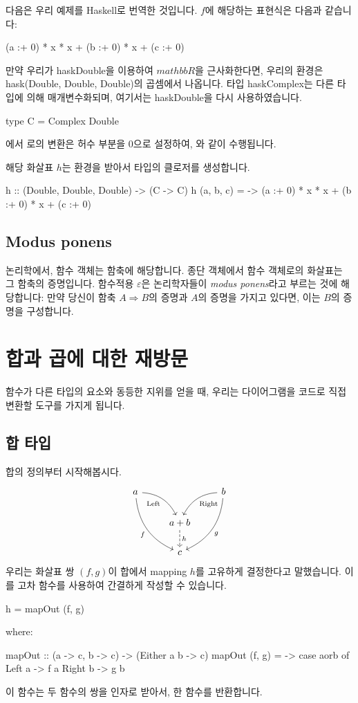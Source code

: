 \documentclass[DaoFP]{subfiles}
\begin{document}
\begin{CJK*}{UTF8}{gbsn}
다음은 우리 예제를 Haskell로 번역한 것입니다. $f$에 해당하는 표현식은 다음과 같습니다:
\begin{haskell}
(a :+ 0) * x * x + (b :+ 0) * x + (c :+ 0)
\end{haskell}
만약 우리가 hask{Double}을 이용하여 $mathbb{R}$을 근사화한다면, 우리의 환경은 hask{(Double, Double, Double)}의 곱셈에서 나옵니다. 타입 hask{Complex}는 다른 타입에 의해 매개변수화되며, 여기서는 hask{Double}을 다시 사용하였습니다.
\begin{haskell}
type C = Complex Double
\end{haskell}
에서 로의 변환은 허수 부분을 0으로 설정하여, 와 같이 수행됩니다.

해당 화살표 $h$는 환경을 받아서  타입의 클로저를 생성합니다.
\begin{haskell}
h :: (Double, Double, Double) -> (C -> C)
h (a, b, c) = \x -> (a :+ 0) * x * x + (b :+ 0) * x + (c :+ 0)
\end{haskell}

\subsection{Modus ponens}

논리학에서, 함수 객체는 함축에 해당합니다. 종단 객체에서 함수 객체로의 화살표는 그 함축의 증명입니다. 함수적용 $\varepsilon$은 논리학자들이 \emph{modus ponens}라고 부르는 것에 해당합니다: 만약 당신이 함축 $A \Rightarrow B$의 증명과 $A$의 증명을 가지고 있다면, 이는 $B$의 증명을 구성합니다.

\section{합과 곱에 대한 재방문}

함수가 다른 타입의 요소와 동등한 지위를 얻을 때, 우리는 다이어그램을 코드로 직접 변환할 도구를 가지게 됩니다.

\subsection{합 타입}

합의 정의부터 시작해봅시다.
\[
 \begin{tikzcd}
 a
 \arrow[dr,  bend left, "\text{Left}"']
 \arrow[ddr, bend right, "f"']
 && b
 \arrow[dl, bend right, "\text{Right}"]
 \arrow[ddl, bend left, "g"]
 \\
&a + b
\arrow[d, dashed, "h"]
\\
& c
 \end{tikzcd}
\]
우리는 화살표 쌍 $(f, g)$이 합에서 mapping $h$를 고유하게 결정한다고 말했습니다. 이를 고차 함수를 사용하여 간결하게 작성할 수 있습니다.
\begin{haskell}
h = mapOut (f, g)
\end{haskell}
where:
\begin{haskell}
mapOut :: (a -> c, b -> c) -> (Either a b -> c)
mapOut (f, g) = \aorb -> case aorb of
                         Left  a -> f a
                         Right b -> g b
\end{haskell}
이 함수는 두 함수의 쌍을 인자로 받아서, 한 함수를 반환합니다. 


\end{CJK*}
\end{document}
